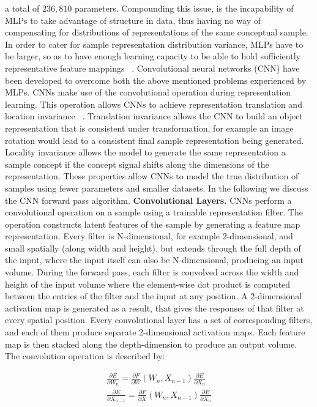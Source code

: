 a total of $236,810$ parameters. Compounding this issue, is the incapability of MLPs to take advantage of structure in data, thus having no way of compensating for distributions of representations of the same conceptual sample. In order to cater for sample representation distribution variance, MLPs have to be larger, so as to have enough learning capacity to be able to hold sufficiently representative feature mappings ~\citep{lecun1998gradient}. \newline
Convolutional neural networks (CNN) have been developed to overcome both the above mentioned problems experienced by MLPs. CNNs make use of the convolutional operation during representation learning. This operation allows CNNs to achieve representation translation and location invariance ~\citep{simonyan2014very}. Translation invariance allows the CNN to build an object representation that is consistent under transformation, for example an image rotation would lead to a consistent final sample representation being generated. Locality invariance allows the model to generate the same representation a sample concept if the concept signal shifts along the dimensions of the representation. These properties allow CNNs to model the true distribution of samples using fewer parameters and smaller datasets. In the following we discuss the CNN forward pass algorithm. \newline
\textbf{Convolutional Layers.} CNNs perform a convolutional operation on a sample using a trainable representation filter. The operation constructs latent features of the sample by generating a feature map representation. Every filter is N-dimensional, for example 2-dimensional, and small spatially (along width and height), but extends through the full depth of the input, where the input itself can also be N-dimensional, producing an input volume.  During the forward pass, each filter is convolved across the width and height of the input volume where the element-wise dot product is computed between the entries of the filter and the input at any position. A 2-dimensional activation map is generated as a result, that gives the responses of that filter at every spatial position. Every convolutional layer has a set of corresponding filters, and each of them produce separate 2-dimensional activation maps. Each feature map is then stacked along the depth-dimension to produce an output volume. The convolution operation is described by:

\begin{subequations}
\begin{gather}
	\frac{\partial E} {\partial W_n} = \frac{\partial F} {\partial W}(W_n, X_{n-1})\frac{\partial E} {\partial X_n} \\
	\frac{\partial E} {\partial X_{n-1}} = \frac{\partial F} {\partial X}(W_n, X_{n-1})\frac{\partial E} {\partial X_n} 
\end{gather}
\end{subequations}


